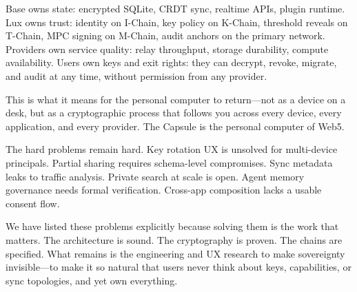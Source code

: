 \documentclass[11pt,a4paper]{article}
\begin{document}
Base owns state: encrypted SQLite, CRDT sync, realtime APIs, plugin runtime.
Lux owns trust: identity on I-Chain, key policy on K-Chain, threshold reveals
on T-Chain, MPC signing on M-Chain, audit anchors on the primary network.
Providers own service quality: relay throughput, storage durability, compute
availability. Users own keys and exit rights: they can decrypt, revoke,
migrate, and audit at any time, without permission from any provider.

This is what it means for the personal computer to return---not as a device
on a desk, but as a cryptographic process that follows you across every device,
every application, and every provider. The Capsule is the personal computer
of Web5.

The hard problems remain hard. Key rotation UX is unsolved for multi-device
principals. Partial sharing requires schema-level compromises. Sync metadata
leaks to traffic analysis. Private search at scale is open. Agent memory
governance needs formal verification. Cross-app composition lacks a usable
consent flow.

We have listed these problems explicitly because solving them is the work
that matters. The architecture is sound. The cryptography is proven. The
chains are specified. What remains is the engineering and UX research to
make sovereignty invisible---to make it so natural that users never think
about keys, capabilities, or sync topologies, and yet own everything.
\end{document}
